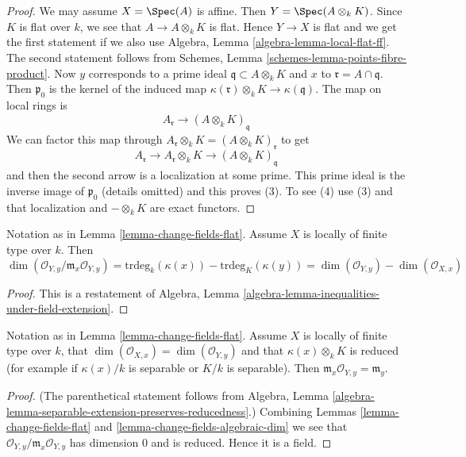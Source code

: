 \begin{proof}
We may assume $X = \Spec(A)$ is affine. Then $Y = \Spec(A \otimes_k K)$.
Since $K$ is flat over $k$, we see that $A \to A \otimes_k K$ is flat.
Hence $Y \to X$ is flat and we get the first statement if we also
use Algebra, Lemma \ref{algebra-lemma-local-flat-ff}.
The second statement follows from
Schemes, Lemma \ref{schemes-lemma-points-fibre-product}.
Now $y$ corresponds to a prime ideal $\mathfrak q \subset A \otimes_k K$
and $x$ to $\mathfrak r = A \cap \mathfrak q$. Then $\mathfrak p_0$
is the kernel of the induced map
$\kappa(\mathfrak r) \otimes_k K \to \kappa(\mathfrak q)$.
The map on local rings is
$$
A_\mathfrak r \longrightarrow (A \otimes_k K)_\mathfrak q
$$
We can factor this map through
$A_\mathfrak r \otimes_k K = (A \otimes_k K)_{\mathfrak r}$
to get
$$
A_\mathfrak r \longrightarrow A_\mathfrak r \otimes_k K
\longrightarrow (A \otimes_k K)_\mathfrak q
$$
and then the second arrow is a localization at some prime. This prime ideal
is the inverse image of $\mathfrak p_0$ (details omitted) and this
proves (3). To see (4) use (3) and that localization and $- \otimes_k K$
are exact functors.
\end{proof}

\begin{lemma}
\label{lemma-change-fields-algebraic-dim}
Notation as in Lemma \ref{lemma-change-fields-flat}.
Assume $X$ is locally of finite type over $k$. Then
$$
\dim(\mathcal{O}_{Y, y}/\mathfrak m_x\mathcal{O}_{Y, y}) =
\text{trdeg}_k(\kappa(x)) - \text{trdeg}_K(\kappa(y)) =
\dim(\mathcal{O}_{Y, y}) - \dim(\mathcal{O}_{X, x})
$$
\end{lemma}

\begin{proof}
This is a restatement of Algebra, Lemma
\ref{algebra-lemma-inequalities-under-field-extension}.
\end{proof}

\begin{lemma}
\label{lemma-change-fields-algebraic-unramified}
Notation as in Lemma \ref{lemma-change-fields-flat}.
Assume $X$ is locally of finite type over $k$,
that $\dim(\mathcal{O}_{X, x}) = \dim(\mathcal{O}_{Y, y})$
and that $\kappa(x) \otimes_k K$ is reduced
(for example if $\kappa(x)/k$ is separable or $K/k$ is separable).
Then $\mathfrak m_x \mathcal{O}_{Y, y} = \mathfrak m_y$.
\end{lemma}

\begin{proof}
(The parenthetical statement follows from
Algebra, Lemma \ref{algebra-lemma-separable-extension-preserves-reducedness}.)
Combining Lemmas \ref{lemma-change-fields-flat} and
\ref{lemma-change-fields-algebraic-dim}
we see that $\mathcal{O}_{Y, y}/\mathfrak m_x \mathcal{O}_{Y, y}$
has dimension $0$ and is reduced. Hence it is a field.
\end{proof}





